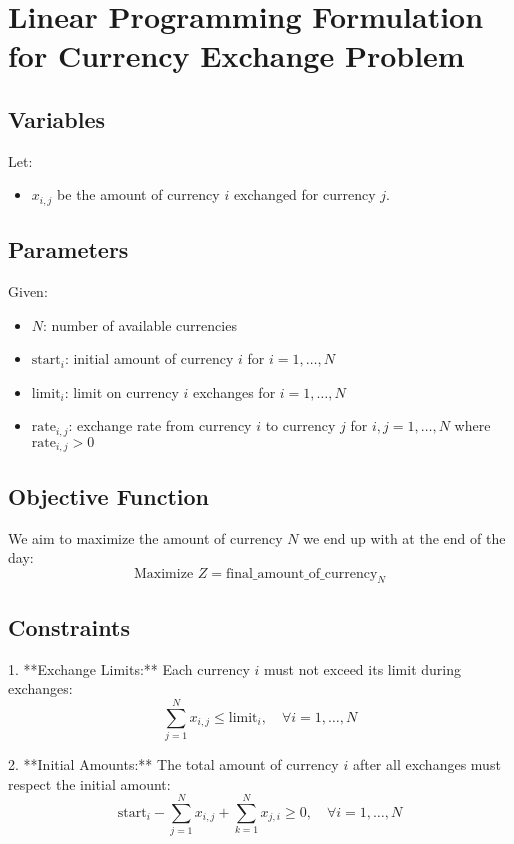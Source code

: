 \documentclass{article}
\begin{document}
\section*{Linear Programming Formulation for Currency Exchange Problem}

\subsection*{Variables}
Let:
\begin{itemize}
    \item \( x_{i,j} \) be the amount of currency \( i \) exchanged for currency \( j \).
\end{itemize}

\subsection*{Parameters}
Given:
\begin{itemize}
    \item \( N \): number of available currencies
    \item \( \text{start}_i \): initial amount of currency \( i \) for \( i = 1, \ldots, N \)
    \item \( \text{limit}_i \): limit on currency \( i \) exchanges for \( i = 1, \ldots, N \)
    \item \( \text{rate}_{i,j} \): exchange rate from currency \( i \) to currency \( j \) for \( i, j = 1, \ldots, N \) where \( \text{rate}_{i,j} > 0 \)
\end{itemize}

\subsection*{Objective Function}
We aim to maximize the amount of currency \( N \) we end up with at the end of the day:
\[
\text{Maximize } Z = \text{final\_amount\_of\_currency}_N
\]

\subsection*{Constraints}
1. **Exchange Limits:**
   Each currency \( i \) must not exceed its limit during exchanges:
   \[
   \sum_{j=1}^{N} x_{i,j} \leq \text{limit}_i, \quad \forall i = 1, \ldots, N
   \]

2. **Initial Amounts:**
   The total amount of currency \( i \) after all exchanges must respect the initial amount:
   \[
   \text{start}_i - \sum_{j=1}^{N} x_{i,j} + \sum_{k=1}^{N} x_{j,i} \geq 0, \quad \forall i = 1, \ldots, N
   \]
\end{document}
